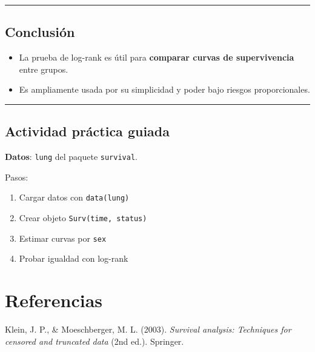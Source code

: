 \documentclass[
]{article}
\newlength{\cslhangindent}
\newenvironment{CSLReferences}[2] %
 {\begin{list}{}{%
  \setlength{\itemindent}{0pt}
  \setlength{\leftmargin}{0pt}
  \setlength{\parsep}{0pt}
  \ifodd #1
   \setlength{\leftmargin}{\cslhangindent}
   \setlength{\itemindent}{-1\cslhangindent}
  \fi
  \setlength{\itemsep}{#2\baselineskip}}}
 {\end{list}}
\providecommand{\tightlist}{%
  \setlength{\itemsep}{0pt}\setlength{\parskip}{0pt}}
\begin{document}
\begin{center}\rule{0.5\linewidth}{0.5pt}\end{center}

\subsection{Conclusión}\label{conclusiuxf3n}

\begin{itemize}
\tightlist
\item
  La prueba de log-rank es útil para \textbf{comparar curvas de
  supervivencia} entre grupos.
\item
  Es ampliamente usada por su simplicidad y poder bajo riesgos
  proporcionales.
\end{itemize}

\begin{center}\rule{0.5\linewidth}{0.5pt}\end{center}

\subsection{Actividad práctica
guiada}\label{actividad-pruxe1ctica-guiada}

\textbf{Datos}: \texttt{lung} del paquete \texttt{survival}.

Pasos:

\begin{enumerate}
\def\labelenumi{\arabic{enumi}.}
\tightlist
\item
  Cargar datos con \texttt{data(lung)}
\item
  Crear objeto \texttt{Surv(time,\ status)}
\item
  Estimar curvas por \texttt{sex}
\item
  Probar igualdad con log-rank
\end{enumerate}

\section{Referencias}\label{referencias}

\label{refs}
\begin{CSLReferences}{1}{0}
Klein, J. P., \& Moeschberger, M. L. (2003). \emph{Survival analysis:
Techniques for censored and truncated data} (2nd ed.). Springer.

\end{CSLReferences}
\end{document}

